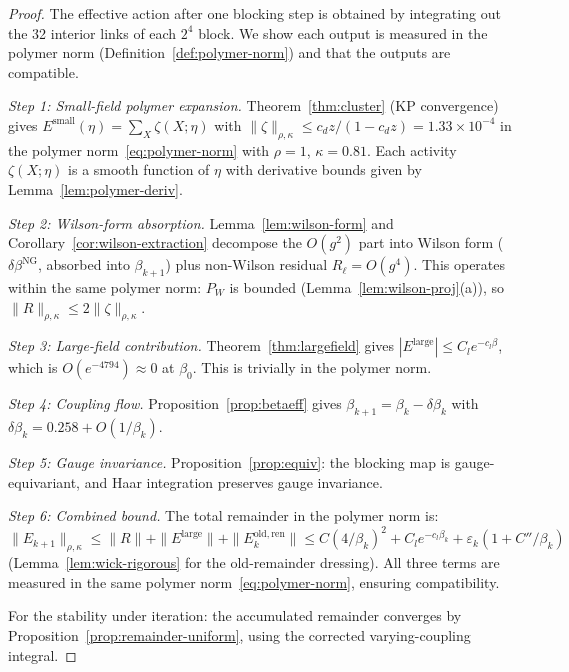 \documentclass[11pt]{article}
\theoremstyle{definition}
\begin{document}
\begin{proof}
The effective action after one blocking step is obtained by
integrating out the 32 interior links of each $2^4$ block.
We show each output is measured in the polymer norm
(Definition~\ref{def:polymer-norm}) and that the
outputs are compatible.

\emph{Step 1: Small-field polymer expansion.}
Theorem~\ref{thm:cluster} (KP convergence) gives
$E^{\mathrm{small}}(\eta)=\sum_X\zeta(X;\eta)$
with $\|\zeta\|_{\rho,\kappa}\le c_d z/(1-c_d z)
=1.33\times 10^{-4}$
in the polymer norm~\eqref{eq:polymer-norm}
with $\rho=1$, $\kappa=0.81$.
Each activity $\zeta(X;\eta)$ is a smooth function
of $\eta$ with derivative bounds given by
Lemma~\ref{lem:polymer-deriv}.

\emph{Step 2: Wilson-form absorption.}
Lemma~\ref{lem:wilson-form} and
Corollary~\ref{cor:wilson-extraction} decompose the
$O(g^2)$ part into Wilson form ($\delta\beta^{\mathrm{NG}}$,
absorbed into $\beta_{k+1}$) plus non-Wilson residual
$R_\ell=O(g^4)$.  This operates within the same polymer
norm: $P_W$ is bounded (Lemma~\ref{lem:wilson-proj}(a)),
so $\|R\|_{\rho,\kappa}\le 2\|\zeta\|_{\rho,\kappa}$.

\emph{Step 3: Large-field contribution.}
Theorem~\ref{thm:largefield} gives
$|E^{\mathrm{large}}|\le C_l e^{-c_l\beta}$,
which is $O(e^{-4794})\approx 0$ at $\beta_0$.
This is trivially in the polymer norm.

\emph{Step 4: Coupling flow.}
Proposition~\ref{prop:betaeff} gives
$\beta_{k+1}=\beta_k-\delta\beta_k$ with
$\delta\beta_k=0.258+O(1/\beta_k)$.

\emph{Step 5: Gauge invariance.}
Proposition~\ref{prop:equiv}: the blocking map is
gauge-equivariant, and Haar integration preserves
gauge invariance.

\emph{Step 6: Combined bound.}
The total remainder in the polymer norm is:
$\|E_{k+1}\|_{\rho,\kappa}
\le\|R\|+\|E^{\mathrm{large}}\|+\|E_k^{\mathrm{old,ren}}\|
\le C(4/\beta_k)^2+C_l e^{-c_l\beta_k}
+\varepsilon_k(1+C''/\beta_k)$
(Lemma~\ref{lem:wick-rigorous} for the old-remainder
dressing).  All three terms are measured in the same
polymer norm~\eqref{eq:polymer-norm}, ensuring
compatibility.

For the stability under iteration: the accumulated
remainder converges by
Proposition~\ref{prop:remainder-uniform}, using the
corrected varying-coupling integral.
\end{proof}

\end{document}
